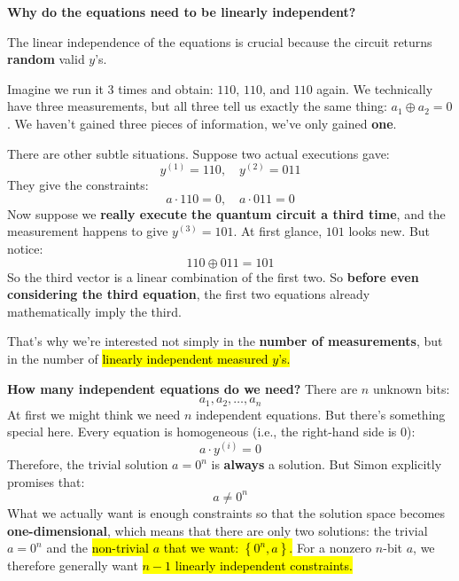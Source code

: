 \highspace
\begin{flushleft}
    \textcolor{Red2}{ \textbf{Why do the equations need to be linearly independent?}}
\end{flushleft}
The linear independence of the equations is crucial because the circuit returns \textbf{random} valid $y$'s.

\highspace
Imagine we run it 3 times and obtain: $110$, $110$, and $110$ again. We technically have three measurements, but all three tell us exactly the same thing: $a_1 \oplus a_2 = 0$. We haven't gained three pieces of information, we've only gained \textbf{one}.

\highspace
There are other subtle situations. Suppose two actual executions gave:
\begin{equation*}
    y^{(1)} = 110, \quad y^{(2)} = 011
\end{equation*}
They give the constraints:
\begin{equation*}
    a \cdot 110 = 0, \quad a \cdot 011 = 0
\end{equation*}
Now suppose we \textbf{really execute the quantum circuit a third time}, and the measurement happens to give $y^{(3)} = 101$. At first glance, $101$ looks new. But notice:
\begin{equation*}
    110 \oplus 011 = 101
\end{equation*}
So the third vector is a linear combination of the first two. So \textbf{before even considering the third equation}, the first two equations already mathematically imply the third.

\highspace
That's why we're interested not simply in the \textbf{number of measurements}, but in the number of \hl{linearly independent measured $y$'s.}

\highspace
\textcolor{Green3}{ \textbf{How many independent equations do we need?}} There are $n$ unknown bits:
\begin{equation*}
    a_1, a_2, \dots, a_n
\end{equation*}
At first we might think we need $n$ independent equations. But there's something special here. Every equation is homogeneous (i.e., the right-hand side is $0$):
\begin{equation*}
    a \cdot y^{(i)} = 0
\end{equation*}
Therefore, the trivial solution $a = 0^{n}$ is \textbf{always} a solution. But Simon explicitly promises that:
\begin{equation*}
    a \neq 0^{n}
\end{equation*}
What we actually want is enough constraints so that the solution space becomes \textbf{one-dimensional}, which means that there are only two solutions: the trivial $a = 0^{n}$ and the \hl{non-trivial $a$ that we want: $\left\{0^{n}, a\right\}$.} For a nonzero $n$-bit $a$, we therefore generally want \hl{$n-1$ linearly independent constraints.}


